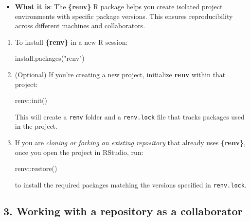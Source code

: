 \documentclass[
  letterpaper,
  DIV=11,
  numbers=noendperiod]{scrartcl}
\newenvironment{Shaded}{\begin{snugshade}}{\end{snugshade}}
\newcommand{\FunctionTok}[1]{\textcolor[rgb]{0.28,0.35,0.67}{#1}}
\newcommand{\NormalTok}[1]{\textcolor[rgb]{0.00,0.23,0.31}{#1}}
\newcommand{\SpecialCharTok}[1]{\textcolor[rgb]{0.37,0.37,0.37}{#1}}
\newcommand{\StringTok}[1]{\textcolor[rgb]{0.13,0.47,0.30}{#1}}
\providecommand{\tightlist}{%
  \setlength{\itemsep}{0pt}\setlength{\parskip}{0pt}}\usepackage{longtable,booktabs,array}
\begin{document}
\begin{itemize}
\tightlist
\item
  \textbf{What it is}: The \textbf{\{renv\}} R package helps you create
  isolated project environments with specific package versions. This
  ensures reproducibility across different machines and collaborators.
\end{itemize}

\begin{enumerate}
\def\labelenumi{\arabic{enumi}.}
\item
  To install \textbf{\{renv\}} in a new R session:

\begin{Shaded}
\begin{Highlighting}[]
\FunctionTok{install.packages}\NormalTok{(}\StringTok{"renv"}\NormalTok{)}
\end{Highlighting}
\end{Shaded}
\item
  (Optional) If you're creating a new project, initialize \textbf{renv}
  within that project:

\begin{Shaded}
\begin{Highlighting}[]
\NormalTok{renv}\SpecialCharTok{::}\FunctionTok{init}\NormalTok{()}
\end{Highlighting}
\end{Shaded}

  This will create a \texttt{renv} folder and a \texttt{renv.lock} file
  that tracks packages used in the project.
\item
  If you are \emph{cloning or forking an existing repository} that
  already uses \textbf{\{renv\}}, once you open the project in RStudio,
  run:

\begin{Shaded}
\begin{Highlighting}[]
\NormalTok{renv}\SpecialCharTok{::}\FunctionTok{restore}\NormalTok{()}
\end{Highlighting}
\end{Shaded}

  to install the required packages matching the versions specified in
  \texttt{renv.lock}.
\end{enumerate}

\subsection{3. Working with a repository as a
collaborator}\label{working-with-a-repository-as-a-collaborator}
\end{document}
